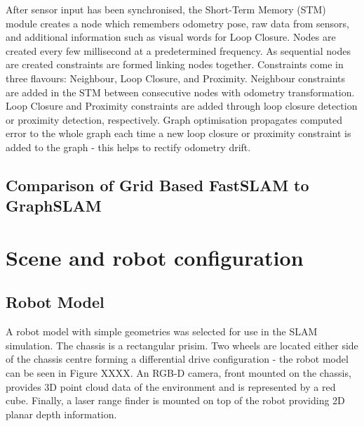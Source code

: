 \documentclass[a4paper]{article}
\begin{document}
After sensor input has been synchronised, the Short-Term Memory (STM) module creates a node which remembers odometry pose, raw data from sensors, and additional information such as visual words for Loop Closure. Nodes are created every few millisecond at a predetermined frequency. As sequential nodes are created constraints are formed linking nodes together. Constraints come in three flavours: Neighbour, Loop Closure, and Proximity. Neighbour constraints are added in the STM between consecutive nodes with odometry transformation. Loop Closure and Proximity constraints are added through loop closure detection or proximity detection, respectively. Graph optimisation propagates computed error to the whole graph each time a new loop closure or proximity constraint is added to the graph - this helps to rectify odometry drift.

\subsection{Comparison of Grid Based FastSLAM to GraphSLAM}
\lipsum[30]

\newpage

\section{Scene and robot configuration}
\subsection{Robot Model}
A robot model with simple geometries was selected for use in the SLAM simulation. The chassis is a rectangular prisim. Two wheels are located either side of the chassis centre forming a differential drive configuration - the robot model can be seen in Figure XXXX. An RGB-D camera, front mounted on the chassis, provides 3D point cloud data of the environment and is represented by a red cube. Finally, a laser range finder is mounted on top of the robot providing 2D planar depth information.\\
\end{document}
